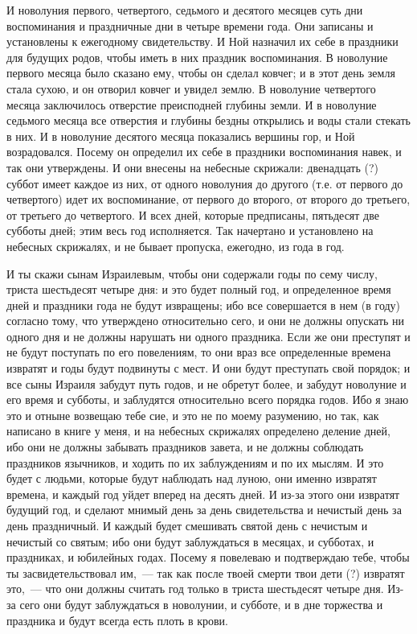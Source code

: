 И новолуния первого, четвертого, седьмого и десятого месяцев суть дни
воспоминания и праздничные дни в четыре времени года. Они записаны и
установлены к ежегодному свидетельству. И Ной назначил их себе в праздники для
будущих родов, чтобы иметь в них праздник воспоминания. В новолуние первого
месяца было сказано ему, чтобы он сделал ковчег; и в этот день земля стала
сухою, и он отворил ковчег и увидел землю. В новолуние четвертого месяца
заключилось отверстие преисподней глубины земли. И в новолуние седьмого месяца
все отверстия и глубины бездны открылись и воды стали стекать в них. И в
новолуние десятого месяца показались вершины гор, и Ной возрадовался. Посему он
определил их себе в праздники воспоминания навек, и так они утверждены. И они
внесены на небесные скрижали: двенадцать (?) суббот имеет каждое из них, от
одного новолуния до другого (т.е. от первого до четвертого) идет
их воспоминание, от первого до второго, от второго до третьего, от третьего до
четвертого. И всех дней, которые предписаны, пятьдесят две субботы дней; этим
весь год исполняется. Так начертано и установлено на небесных скрижалях, и не
бывает пропуска, ежегодно, из года в год.

И ты скажи сынам Израилевым, чтобы они содержали годы по сему числу, триста
шестьдесят четыре дня: и это будет полный год, и определенное время дней и
праздники года не будут извращены; ибо все совершается в нем (в году) согласно
тому, что утверждено относительно сего, и они не должны опускать ни одного дня
и не должны нарушать ни одного праздника. Если же они преступят и не будут
поступать по его повелениям, то они враз все определенные времена извратят и
годы будут подвинуты с мест. И они будут преступать свой порядок; и все сыны
Израиля забудут путь годов, и не обретут более, и забудут новолуние и его время
и субботы, и заблудятся относительно всего порядка годов. Ибо я знаю это и
отныне возвещаю тебе сие, и это не по моему разумению, но так, как написано в
книге у меня, и на небесных скрижалях определено деление дней, ибо они не
должны забывать праздников завета, и не должны соблюдать праздников язычников,
и ходить по их заблуждениям и по их мыслям. И это будет с людьми, которые будут
наблюдать над луною, они именно извратят времена, и каждый год уйдет вперед на
десять дней. И из-за этого они извратят будущий год, и сделают мнимый день за
день свидетельства и нечистый день за день праздничный. И каждый будет
смешивать святой день с нечистым и нечистый со святым; ибо они будут
заблуждаться в месяцах, и субботах, и праздниках, и юбилейных годах. Посему я
повелеваю и подтверждаю тебе, чтобы ты засвидетельствовал им,~--- так как
после твоей смерти твои дети (?) извратят это,~--- что они должны считать
год только в триста шестьдесят четыре дня. Из-за сего они будут заблуждаться в
новолунии, и субботе, и в дне торжества и праздника и будут всегда есть плоть в
крови.

